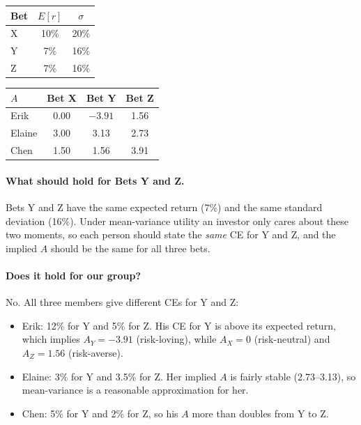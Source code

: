 \documentclass[11pt]{article}
\begin{document}
\begin{center}
\begin{tabular}{lcc}
\toprule
Bet & $E[r]$ & $\sigma$ \\
\midrule
X & 10\% & 20\% \\
Y & 7\%  & 16\% \\
Z & 7\%  & 16\% \\
\bottomrule
\end{tabular}
\qquad
\begin{tabular}{lccc}
\toprule
$A$ & Bet X & Bet Y & Bet Z \\
\midrule
Erik   & 0.00 & $-3.91$ & 1.56 \\
Elaine & 3.00 & 3.13    & 2.73 \\
Chen   & 1.50 & 1.56    & 3.91 \\
\bottomrule
\end{tabular}
\end{center}

\paragraph{What should hold for Bets Y and Z.}
Bets Y and Z have the same expected return (7\%) and the same standard deviation (16\%). Under mean-variance utility an investor only cares about these two moments, so each person should state the \emph{same} CE for Y and Z, and the implied $A$ should be the same for all three bets.

\paragraph{Does it hold for our group?}
No. All three members give different CEs for Y and Z:
\begin{itemize}
  \item Erik: 12\% for Y and 5\% for Z. His CE for Y is above its expected return, which implies $A_Y = -3.91$ (risk-loving), while $A_X = 0$ (risk-neutral) and $A_Z = 1.56$ (risk-averse).
  \item Elaine: 3\% for Y and 3.5\% for Z. Her implied $A$ is fairly stable (2.73--3.13), so mean-variance is a reasonable approximation for her.
  \item Chen: 5\% for Y and 2\% for Z, so his $A$ more than doubles from Y to Z.
\end{itemize}
\end{document}
